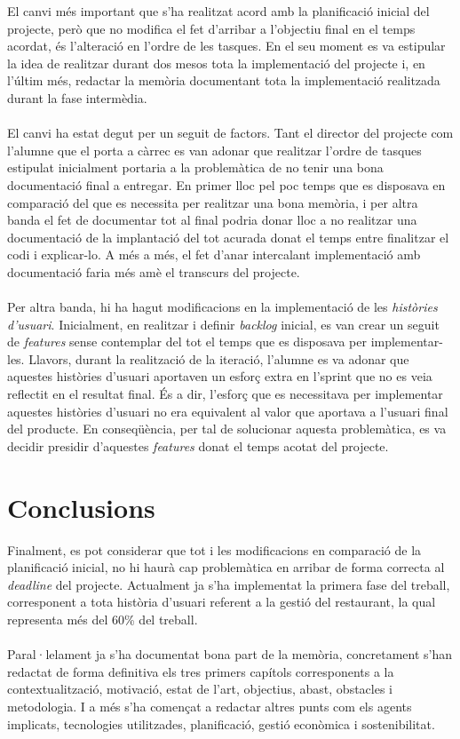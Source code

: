El canvi més important que s'ha realitzat acord amb la planificació inicial del projecte, però que no modifica el fet d'arribar a l'objectiu final en el temps acordat, és l'alteració en l'ordre de les tasques. En el seu moment es va estipular la idea de realitzar durant dos mesos tota la implementació del projecte i, en l'últim més, redactar la memòria documentant tota la implementació realitzada durant la fase intermèdia.
\\\\
El canvi ha estat degut per un seguit de factors. Tant el director del projecte com l'alumne que el porta a càrrec es van adonar que realitzar l'ordre de tasques estipulat inicialment portaria a la problemàtica de no tenir una bona documentació final a entregar. En primer lloc pel poc temps que es disposava en comparació del que es necessita per realitzar una bona memòria, i per altra banda el fet de documentar tot al final podria donar lloc a no realitzar una documentació de la implantació del tot acurada donat el temps entre finalitzar el codi i explicar-lo. A més a més, el fet d'anar intercalant implementació amb documentació faria més amè el transcurs del projecte.
\\\\
Per altra banda, hi ha hagut modificacions en la implementació de les \textit{històries d'usuari}. Inicialment, en realitzar i definir \textit{backlog} inicial, es van crear un seguit de \textit{features} sense contemplar del tot el temps que es disposava per implementar-les. Llavors, durant la realització de la iteració, l'alumne es va adonar que aquestes històries d'usuari aportaven un esforç extra en l'sprint que no es veia reflectit en el resultat final. És a dir, l'esforç que es necessitava per implementar aquestes històries d'usuari no era equivalent al valor que aportava a l'usuari final del producte. En conseqüència, per tal de solucionar aquesta problemàtica, es va decidir presidir d'aquestes \textit{features} donat el temps acotat del projecte.


\section{Conclusions}

Finalment, es pot considerar que tot i les modificacions en comparació de la planificació inicial, no hi haurà cap problemàtica en arribar de forma correcta al \textit{deadline} del projecte. Actualment ja s'ha implementat la primera fase del treball, corresponent a tota història d'usuari referent a la gestió del restaurant, la qual representa més del 60\% del treball.
\\\\
Paral·lelament ja s'ha documentat bona part de la memòria, concretament s'han redactat de forma definitiva els tres primers capítols corresponents a la contextualització, motivació, estat de l'art, objectius, abast, obstacles i metodologia. I a més s'ha començat a redactar altres punts com els agents implicats, tecnologies utilitzades, planificació, gestió econòmica i sostenibilitat.